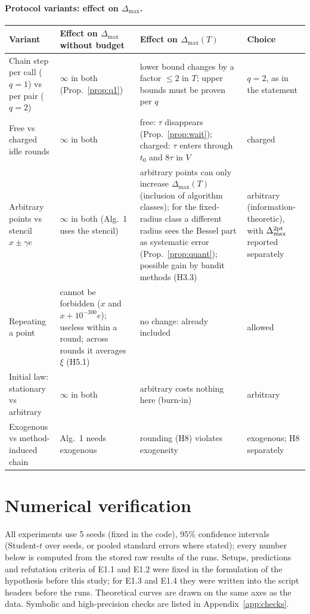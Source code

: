 \documentclass[11pt,a4paper]{article}
\numberwithin{equation}{section}
\theoremstyle{definition}
\theoremstyle{remark}
\newcommand{\Dmax}{\Delta_{\max}}\newcommand{\Dcp}{\Delta_{\rm cp}}
\begin{document}
\paragraph{Protocol variants: effect on $\Dmax$.}
\begin{center}\small
\begin{tabularx}{\textwidth}{@{}p{3.3cm}p{4.0cm}Xp{1.9cm}@{}}
\toprule
\textbf{Variant} & \textbf{Effect on $\Dmax$ without budget} & \textbf{Effect on $\Dmax(T)$} & \textbf{Choice}\\\midrule
Chain step per call ($q=1$) vs per pair ($q=2$) & $\infty$ in both (Prop.~\ref{prop:q1}) & lower bound changes by a factor $\le2$ in $T$; upper bounds must be proven per $q$ & $q=2$, as in the statement \\
Free vs charged idle rounds & $\infty$ in both & free: $\tau$ disappears (Prop.~\ref{prop:wait}); charged: $\tau$ enters through $t_0$ and $8\tau$ in $V$ & charged \\
Arbitrary points vs stencil $x\pm\gamma e$ & $\infty$ in both (Alg.~1 uses the stencil) & arbitrary points can only increase $\Dmax(T)$ (inclusion of algorithm classes); for the fixed-radius class a different radius sees the Bessel part as systematic error (Prop.~\ref{prop:quant}); possible gain by bandit methods (H3.3) & arbitrary (information-theoretic), with $\Dmax^{\rm 2pt}$ reported separately \\
Repeating a point & cannot be forbidden ($x$ and $x+10^{-300}e$); useless within a round; across rounds it averages $\xi$ (H5.1) & no change: already included & allowed \\
Initial law: stationary vs arbitrary & $\infty$ in both & arbitrary costs nothing here (burn-in) & arbitrary \\
Exogenous vs method-induced chain & Alg.~1 needs exogenous & rounding (H8) violates exogeneity & exogenous; H8 separately \\
\bottomrule
\end{tabularx}
\end{center}

\section{Numerical verification}\label{sec:num}
All experiments use 5 seeds (fixed in the code), 95\% confidence intervals (Student-$t$ over seeds, or pooled standard errors where stated); every number below is computed from the stored raw results of the runs. Setups, predictions and refutation criteria of E1.1 and E1.2 were fixed in the formulation of the hypothesis before this study; for E1.3 and E1.4 they were written into the script headers before the runs. Theoretical curves are drawn on the same axes as the data. Symbolic and high-precision checks are listed in Appendix~\ref{app:checks}.
\end{document}
